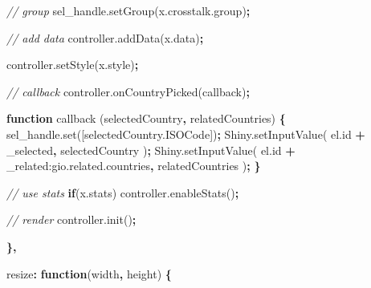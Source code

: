 \documentclass[
]{krantz}
\makeatletter
\newenvironment{Shaded}{\begin{snugshade}}{\end{snugshade}}
\newcommand{\AttributeTok}[1]{\textcolor[rgb]{0.61,0.61,0.61}{#1}}
\newcommand{\CommentTok}[1]{\textcolor[rgb]{0.37,0.37,0.37}{\textit{#1}}}
\newcommand{\ControlFlowTok}[1]{\textcolor[rgb]{0.27,0.27,0.27}{\textbf{#1}}}
\newcommand{\DataTypeTok}[1]{\textcolor[rgb]{0.27,0.27,0.27}{#1}}
\newcommand{\KeywordTok}[1]{\textcolor[rgb]{0.27,0.27,0.27}{\textbf{#1}}}
\newcommand{\NormalTok}[1]{#1}
\newcommand{\OperatorTok}[1]{\textcolor[rgb]{0.43,0.43,0.43}{\textbf{#1}}}
\newcommand{\StringTok}[1]{\textcolor[rgb]{0.5,0.5,0.5}{#1}}
\newcommand{\VariableTok}[1]{\textcolor[rgb]{0,0,0}{#1}}
\newenvironment{kframe}{%
\medskip{}
\setlength{\fboxsep}{.8em}
 \def\at@end@of@kframe{}%
 \ifinner\ifhmode%
  \def\at@end@of@kframe{\end{minipage}}%
  \begin{minipage}{\columnwidth}%
 \fi\fi%
 \def\FrameCommand##1{\hskip\@totalleftmargin \hskip-\fboxsep
 \colorbox{shadecolor}{##1}\hskip-\fboxsep
     \hskip-\linewidth \hskip-\@totalleftmargin \hskip\columnwidth}%
 \MakeFramed {\advance\hsize-\width
   \@totalleftmargin\z@ \linewidth\hsize
   \@setminipage}}%
 {\par\unskip\endMakeFramed%
 \at@end@of@kframe}
\renewenvironment{Shaded}{\begin{kframe}}{\end{kframe}}
\makeatother
\begin{document}
\begin{Shaded}
\begin{Highlighting}[]
        \CommentTok{// group}
        \VariableTok{sel\_handle}\NormalTok{.}\AttributeTok{setGroup}\NormalTok{(}\VariableTok{x}\NormalTok{.}\VariableTok{crosstalk}\NormalTok{.}\AttributeTok{group}\NormalTok{)}\OperatorTok{;}
        
        \CommentTok{// add data}
        \VariableTok{controller}\NormalTok{.}\AttributeTok{addData}\NormalTok{(}\VariableTok{x}\NormalTok{.}\AttributeTok{data}\NormalTok{)}\OperatorTok{;}

        \VariableTok{controller}\NormalTok{.}\AttributeTok{setStyle}\NormalTok{(}\VariableTok{x}\NormalTok{.}\AttributeTok{style}\NormalTok{)}\OperatorTok{;}

        \CommentTok{// callback}
        \VariableTok{controller}\NormalTok{.}\AttributeTok{onCountryPicked}\NormalTok{(callback)}\OperatorTok{;}

        \KeywordTok{function} \AttributeTok{callback}\NormalTok{ (selectedCountry}\OperatorTok{,}\NormalTok{ relatedCountries) }\OperatorTok{\{}
          \VariableTok{sel\_handle}\NormalTok{.}\AttributeTok{set}\NormalTok{([}\VariableTok{selectedCountry}\NormalTok{.}\AttributeTok{ISOCode}\NormalTok{])}\OperatorTok{;}
          \VariableTok{Shiny}\NormalTok{.}\AttributeTok{setInputValue}\NormalTok{(}
            \VariableTok{el}\NormalTok{.}\AttributeTok{id} \OperatorTok{+} \StringTok{\textquotesingle{}\_selected\textquotesingle{}}\OperatorTok{,} 
\NormalTok{            selectedCountry}
\NormalTok{          )}\OperatorTok{;}
          \VariableTok{Shiny}\NormalTok{.}\AttributeTok{setInputValue}\NormalTok{(}
            \VariableTok{el}\NormalTok{.}\AttributeTok{id} \OperatorTok{+} \StringTok{\textquotesingle{}\_related:gio.related.countries\textquotesingle{}}\OperatorTok{,} 
\NormalTok{            relatedCountries}
\NormalTok{          )}\OperatorTok{;}
        \OperatorTok{\}}

        \CommentTok{// use stats}
        \ControlFlowTok{if}\NormalTok{(}\VariableTok{x}\NormalTok{.}\AttributeTok{stats}\NormalTok{)}
          \VariableTok{controller}\NormalTok{.}\AttributeTok{enableStats}\NormalTok{()}\OperatorTok{;}

        \CommentTok{// render}
        \VariableTok{controller}\NormalTok{.}\AttributeTok{init}\NormalTok{()}\OperatorTok{;}

      \OperatorTok{\},}

      \DataTypeTok{resize}\OperatorTok{:} \KeywordTok{function}\NormalTok{(width}\OperatorTok{,}\NormalTok{ height) }\OperatorTok{\{}


\end{Highlighting}
\end{Shaded}
\end{document}
